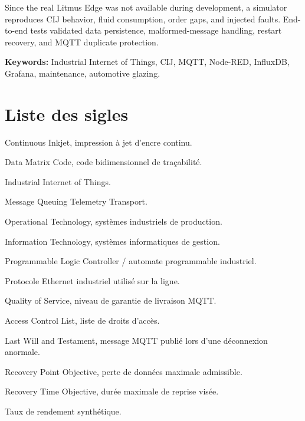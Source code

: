 \documentclass[12pt,a4paper,oneside]{report}
\begin{document}
Since the real Litmus Edge was not available during development, a simulator
reproduces CIJ behavior, fluid consumption, order gaps, and injected faults.
End-to-end tests validated data persistence, malformed-message handling,
restart recovery, and MQTT duplicate protection.

\noindent\textbf{Keywords:} Industrial Internet of Things, CIJ, MQTT,
Node-RED, InfluxDB, Grafana, maintenance, automotive glazing.

\chapter*{Liste des sigles}
\begin{description}[style=nextline,leftmargin=3.4cm,labelwidth=3cm]
  \item[CIJ] Continuous Inkjet, impression à jet d'encre continu.
  \item[DMC] Data Matrix Code, code bidimensionnel de traçabilité.
  \item[IIoT] Industrial Internet of Things.
  \item[MQTT] Message Queuing Telemetry Transport.
  \item[OT] Operational Technology, systèmes industriels de production.
  \item[IT] Information Technology, systèmes informatiques de gestion.
  \item[PLC / API] Programmable Logic Controller / automate programmable industriel.
  \item[PROFINET] Protocole Ethernet industriel utilisé sur la ligne.
  \item[QoS] Quality of Service, niveau de garantie de livraison MQTT.
  \item[ACL] Access Control List, liste de droits d'accès.
  \item[LWT] Last Will and Testament, message MQTT publié lors d'une déconnexion anormale.
  \item[RPO] Recovery Point Objective, perte de données maximale admissible.
  \item[RTO] Recovery Time Objective, durée maximale de reprise visée.
  \item[TRS] Taux de rendement synthétique.
\end{description}

\tableofcontents
\listoffigures
\listoftables
\clearpage













\appendix

\end{document}
